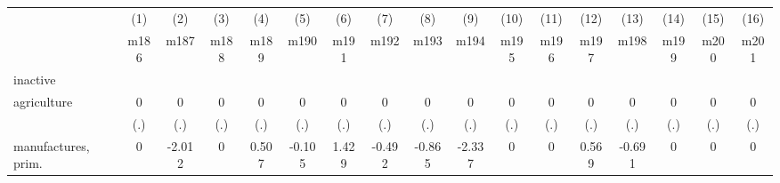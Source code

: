 {
\def\sym#1{\ifmmode^{#1}\else\(^{#1}\)\fi}
\begin{tabular}{l*{16}{c}}
\hline\hline
                    &\multicolumn{1}{c}{(1)}&\multicolumn{1}{c}{(2)}&\multicolumn{1}{c}{(3)}&\multicolumn{1}{c}{(4)}&\multicolumn{1}{c}{(5)}&\multicolumn{1}{c}{(6)}&\multicolumn{1}{c}{(7)}&\multicolumn{1}{c}{(8)}&\multicolumn{1}{c}{(9)}&\multicolumn{1}{c}{(10)}&\multicolumn{1}{c}{(11)}&\multicolumn{1}{c}{(12)}&\multicolumn{1}{c}{(13)}&\multicolumn{1}{c}{(14)}&\multicolumn{1}{c}{(15)}&\multicolumn{1}{c}{(16)}\\
                    &\multicolumn{1}{c}{m186}&\multicolumn{1}{c}{m187}&\multicolumn{1}{c}{m188}&\multicolumn{1}{c}{m189}&\multicolumn{1}{c}{m190}&\multicolumn{1}{c}{m191}&\multicolumn{1}{c}{m192}&\multicolumn{1}{c}{m193}&\multicolumn{1}{c}{m194}&\multicolumn{1}{c}{m195}&\multicolumn{1}{c}{m196}&\multicolumn{1}{c}{m197}&\multicolumn{1}{c}{m198}&\multicolumn{1}{c}{m199}&\multicolumn{1}{c}{m200}&\multicolumn{1}{c}{m201}\\
\hline
inactive            &                     &                     &                     &                     &                     &                     &                     &                     &                     &                     &                     &                     &                     &                     &                     &                     \\
agriculture         &           0         &           0         &           0         &           0         &           0         &           0         &           0         &           0         &           0         &           0         &           0         &           0         &           0         &           0         &           0         &           0         \\
                    &         (.)         &         (.)         &         (.)         &         (.)         &         (.)         &         (.)         &         (.)         &         (.)         &         (.)         &         (.)         &         (.)         &         (.)         &         (.)         &         (.)         &         (.)         &         (.)         \\
[1em]
manufactures, prim. &           0         &      -2.012         &           0         &       0.507         &      -0.105         &       1.429         &      -0.492         &      -0.865         &      -2.337         &           0         &           0         &       0.569         &      -0.691         &           0         &           0         &           0         \\

\end{tabular}}
